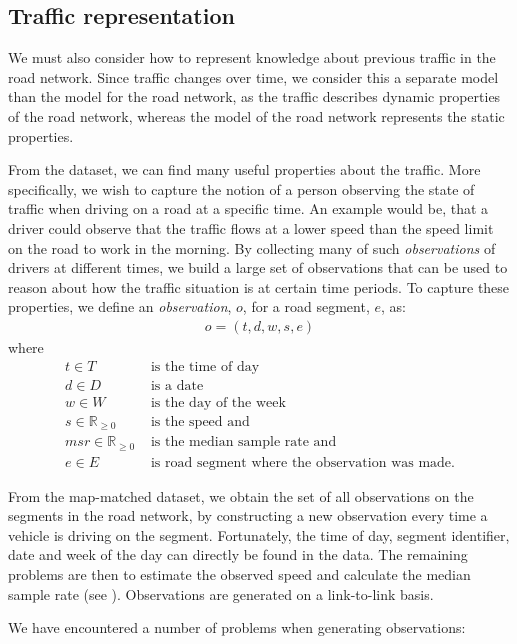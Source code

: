 \subsection{Traffic representation}\label{KR:traffic}
We must also consider how to represent knowledge about previous traffic in the road network. Since traffic changes over time, we consider this a separate model than the model for the road network, as the traffic describes dynamic properties of the road network, whereas the model of the road network represents the static properties.

From the dataset, we can find many useful properties about the traffic. More specifically, we wish to capture the notion of a person observing the state of traffic when driving on a road at a specific time. An example would be, that a driver could observe that the traffic flows at a lower speed than the speed limit on the road to work in the morning. By collecting many of such \emph{observations} of drivers at different times, we build a large set of observations that can be used to reason about how the traffic situation is at certain time periods. To capture these properties, we define an \emph{observation}, $o$, for a road segment, $e$, as:
\begin{align*}
o = (t, d, w, s, e)
\end{align*}
where
\begin{align*}
t \in T &\text{ is the time of day} \\
d \in D &\text{ is a date} \\
w \in W &\text{ is the day of the week} \\
s \in \mathbb{R}_{\ge0} &\text{ is the speed and}\\
msr \in \mathbb{R}_{\ge0} &\text{ is the median sample rate and}\\
e \in E &\text{ is road segment where the observation was made.}
\end{align*}

From the map-matched dataset, we obtain the set of all observations on the segments in the road network, by constructing a new observation every time a vehicle is driving on the segment. Fortunately, the time of day, segment identifier, date and week of the day can directly be found in the data. The remaining problems are then to estimate the observed speed and calculate the median sample rate (see ). Observations are generated on a link-to-link basis.

We have encountered a number of problems when generating observations:


